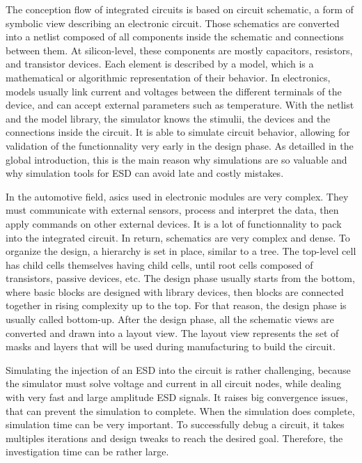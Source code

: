 The conception flow of integrated circuits is based on circuit schematic, a form of symbolic view describing an electronic circuit.
Those schematics are converted into a netlist composed of all components inside the schematic and connections between them.
At silicon-level, these components are mostly capacitors, resistors, and transistor devices.
Each element is described by a model, which is a mathematical or algorithmic representation of their behavior.
In electronics, models usually link current and voltages between the different terminals of the device, and can accept external parameters such as temperature.
With the netlist and the model library, the simulator knows the stimulii, the devices and the connections inside the circuit.
It is able to simulate circuit behavior, allowing for validation of the functionnality very early in the design phase.
As detailled in the global introduction, this is the main reason why simulations are so valuable and why simulation tools for ESD can avoid late and costly mistakes.

In the automotive field, \gls{asic}s used in electronic modules are very complex.
They must communicate with external sensors, process and interpret the data, then apply commands on other external devices.
It is a lot of functionnality to pack into the integrated circuit.
In return, schematics are very complex and dense.
To organize the design, a hierarchy is set in place, similar to a tree.
The top-level cell has child cells themselves having child cells, until root cells composed of transistors, passive devices, etc.
The design phase usually starts from the bottom, where basic blocks are designed with library devices, then blocks are connected together in rising complexity up to the top.
For that reason, the design phase is usually called bottom-up.
After the design phase, all the schematic views are converted and drawn into a layout view.
The layout view represents the set of masks and layers that will be used during manufacturing to build the circuit.

Simulating the injection of an ESD into the circuit is rather challenging, because the simulator must solve voltage and current in all circuit nodes, while dealing with very fast and large amplitude ESD signals.
It raises big convergence issues, that can prevent the simulation to complete.
When the simulation does complete, simulation time can be very important.
To successfully debug a circuit, it takes multiples iterations and design tweaks to reach the desired goal.
Therefore, the investigation time can be rather large.


